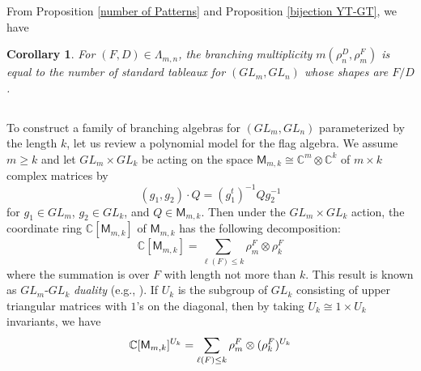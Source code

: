 \documentclass[11pt]{amsart}
\numberwithin{equation}{subsection}
\newtheorem{corollary}[theorem]{Corollary}
\begin{document}
From Proposition \ref{number of Patterns} and 
Proposition \ref{bijection YT-GT}, we have

\begin{corollary}
\label{Tabnumber}For $(F,D)\in \Lambda _{m,n}$, the branching multiplicity 
$m(\rho _{n}^{D},\rho _{m}^{F})$ is equal to the number of standard tableaux
for $({GL}_{{m}},{GL}_{{n}})$ whose shapes are $F/D$.
\end{corollary}


\subsection{}

To construct a family of branching algebras for $({GL}_{m},{GL}_{n})$
parameterized by the length $k$, let us review a polynomial model for the
flag algebra. We assume $m\geq k$ and let ${GL}_{m}\times {GL}_{k}$ be
acting on the space $\mathsf{M}_{m,k} \cong \mathbb{C}^m \otimes \mathbb{C}^k$ 
of $m\times k$ complex matrices by 
\begin{equation}
(g_{1},g_{2})\cdot Q=(g_{1}^{t})^{-1}Q g_{2}^{-1}  \label{doubleaction}
\end{equation}
for $g_{1}\in {GL}_{m}$, $g_{2}\in {GL}_{k}$, and $Q\in \mathsf{M}_{m,k}$.
Then under the ${GL}_{m}\times {GL}_{k}$ action, the coordinate ring 
$\mathbb{C}[\mathsf{M}_{m,k}]$ of $\mathsf{M}_{m,k}$ has the following
decomposition:
\begin{equation*}
\mathbb{C}[\mathsf{M}_{m,k}]=\sum\limits_{\ell (F)\leq k}
\rho_{m}^{F}\otimes \rho _{k}^{F}
\end{equation*}
where the summation is over $F$ with length not more than $k$.
This result is known as ${GL}_{m}$-${GL}_{k}$ \textit{duality} 
(e.g., \cite{GW09, How95}). If $U_{k}$ is the subgroup of ${GL}_{k}$ 
consisting of upper triangular matrices with $1$'s on the diagonal, then by 
taking $U_{k}\cong 1\times U_{k}$ invariants, we have
\begin{equation}
\mathbb{C}[\mathsf{M}_{m,k}]^{U_{k}}=\sum\limits_{\ell (F)\leq k}\rho
_{m}^{F}\otimes (\rho _{k}^{F})^{U_{k}}  \notag
\end{equation}

\subsection{}
\end{document}
